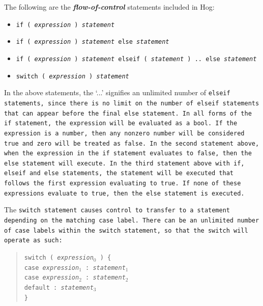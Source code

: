 \documentclass{article}
\begin{document}
The following are the \textbf{\emph{flow-of-control}} statements included in Hog:

\begin{itemize}
  \item[] \tt if ( \rm \emph{expression} \tt ) \rm \emph{statement}
  \item[] \tt if ( \rm \emph{expression} \tt ) \rm \emph{statement} \tt else \rm \emph{statement}
  \item[] \tt if ( \rm \emph{expression} \tt ) \rm \emph{statement} \tt elseif ( \rm \emph{statement} \tt ) .. else 
  \rm \emph{statement}
  \item[] \tt switch ( \rm \emph{expression} \tt ) \rm \emph{statement} \rm
\end{itemize}

In the above statements, the ‘...’ signifies an unlimited number of \tt elseif \rm
statements, since there is no limit on the number of \tt elseif \rm statements
that can appear before the final \tt else \rm statement. In all forms of the \tt
if \rm statement, the expression will be evaluated as a \tt bool\rm. If the
expression is a number, then any non­zero number will be considered \tt true \rm
and zero will be treated as \tt false\rm. In the second statement above, when the
expression in the \tt if \rm statement evaluates to \tt false\rm, then the \tt
else \rm statement will execute. In the third statement above with \tt if\rm, \tt
elseif \rm and \tt else \rm statements, the statement will be executed that
follows the first expression evaluating to \tt true\rm. If none of these
expressions evaluate to \tt true\rm, then the \tt else \rm statement is executed.

The \tt switch \rm statement causes control to transfer to a statement depending
on the matching \tt case \rm label. There can be an unlimited number of \tt case
\rm labels within the \tt switch \rm statement, so that the \tt switch \rm will
operate as such:

\begin{quotation}
  \tt switch ( \rm \emph{expression}$_0$ \tt ) \{\\
  \indent \indent \tt case \rm \emph{expression}$_1$ \tt : \rm\emph{statement}$_1$ \\
  \indent \indent \tt case \rm \emph{expression}$_2$ \tt : \rm\emph{statement}$_2$ \\
  \indent \indent \tt default : \rm \emph{statement}$_3$ \\
  \indent \tt \}
\end{quotation}
\end{document}
